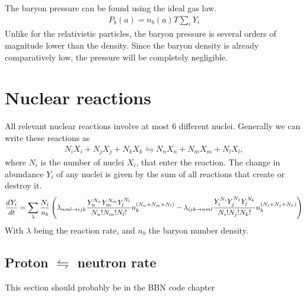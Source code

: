 The baryon pressure can be found using the ideal gas law.
\begin{align}
    P_b(a)= n_b(a)T\sum_{i}^{}Y_i
\end{align}
Unlike for the relativistic particles, the baryon pressure is several orders of magnitude lower than the density. Since the baryon density is already comparatively low, the pressure will be completely negligible.

%
%
\section{Nuclear reactions}
\label{sec:nucleartheory}

All relevant nuclear reactions involve at most 6 different nuclei. Generally we can write these reactions as
\begin{align}
    N_i X_i + N_j X_j + N_k X_k \leftrightharpoons N_n X_n + N_m X_m + N_l X_l ,
\end{align}
where $N_i$ is the number of nuclei $X_i$, that enter the reaction. 
The change in abundance $Y_i$ of any nuclei is given by the sum of all reactions that create or destroy it.
\begin{align}
    \frac{dY_i}{dt}=\sum_\lambda\frac{N_i}{n_b}\left(\lambda_{n m l \rightarrow i j k} \frac{Y_n^{N_n}Y_m^{N_m}Y_l^{N_l}}{N_n!N_m!N_l!}n_b^{(N_n+N_m+N_l)}-\lambda_{i j k \rightarrow n m l}\frac{Y_i^{N_i}Y_j^{N_j}Y_l^{N_k}}{N_i!N_j!N_k!}n_b^{(N_i+N_j+N_k)}\right)
    \label{dYdt}
\end{align}
With $\lambda$ being the reaction rate, and $n_b$ the baryon number density. 

\subsection{Proton $\leftrightharpoons$ neutron rate}
This section should probably be in the BBN code chapter





